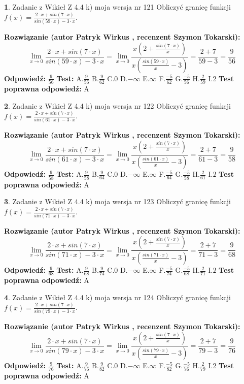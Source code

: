 \documentclass[12pt, a4paper]{article}
\theoremstyle{definition} %
\newtheorem{zad}{}
\newcommand{\zadStart}[1]{\begin{zad}#1\newline}
\newcommand{\zadStop}{\end{zad}}
\newcommand{\rozwStart}[2]{\noindent \textbf{Rozwiązanie (autor #1 , recenzent #2): }\newline}
\newcommand{\rozwStop}{\newline}
\newcommand{\odpStart}{\noindent \textbf{Odpowiedź:}\newline}
\newcommand{\odpStop}{\newline}
\newcommand{\testStart}{\noindent \textbf{Test:}\newline}
\newcommand{\testStop}{\newline}
\newcommand{\kluczStart}{\noindent \textbf{Test poprawna odpowiedź:}\newline}
\newcommand{\kluczStop}{\newline}
\begin{document}
\zadStart{Zadanie z Wikieł Z 4.4 k) moja wersja nr 121}
Obliczyć granicę funkcji $f(x)=\frac{2\cdot x +sin(7\cdot x)}{sin(59\cdot x) -3\cdot x}$.
\zadStop
\rozwStart{Patryk Wirkus}{Szymon Tokarski}
$$\lim\limits_{x\to 0}\frac{2\cdot x +sin(7\cdot x)}{sin(59\cdot x) -3\cdot x}
=\lim\limits_{x\to 0}\frac{x(2+\frac{sin(7\cdot x)}{x})}{x(\frac{sin(59\cdot x)}{x}-3)}
=\frac{2+7}{59-3} = \frac{9}{56}$$
\rozwStop
\odpStart
$\frac{9}{56}$
\odpStop
\testStart
A.$\frac{9}{56}$
B.$\frac{9}{62}$
C.$0$
D.$-\infty$
E.$\infty$
F.$\frac{-5}{62}$
G.$\frac{-5}{56}$
H.$\frac{2}{59}$
I.$2$
\testStop
\kluczStart
A
\kluczStop



\zadStart{Zadanie z Wikieł Z 4.4 k) moja wersja nr 122}
Obliczyć granicę funkcji $f(x)=\frac{2\cdot x +sin(7\cdot x)}{sin(61\cdot x) -3\cdot x}$.
\zadStop
\rozwStart{Patryk Wirkus}{Szymon Tokarski}
$$\lim\limits_{x\to 0}\frac{2\cdot x +sin(7\cdot x)}{sin(61\cdot x) -3\cdot x}
=\lim\limits_{x\to 0}\frac{x(2+\frac{sin(7\cdot x)}{x})}{x(\frac{sin(61\cdot x)}{x}-3)}
=\frac{2+7}{61-3} = \frac{9}{58}$$
\rozwStop
\odpStart
$\frac{9}{58}$
\odpStop
\testStart
A.$\frac{9}{58}$
B.$\frac{9}{64}$
C.$0$
D.$-\infty$
E.$\infty$
F.$\frac{-5}{64}$
G.$\frac{-5}{58}$
H.$\frac{2}{61}$
I.$2$
\testStop
\kluczStart
A
\kluczStop



\zadStart{Zadanie z Wikieł Z 4.4 k) moja wersja nr 123}
Obliczyć granicę funkcji $f(x)=\frac{2\cdot x +sin(7\cdot x)}{sin(71\cdot x) -3\cdot x}$.
\zadStop
\rozwStart{Patryk Wirkus}{Szymon Tokarski}
$$\lim\limits_{x\to 0}\frac{2\cdot x +sin(7\cdot x)}{sin(71\cdot x) -3\cdot x}
=\lim\limits_{x\to 0}\frac{x(2+\frac{sin(7\cdot x)}{x})}{x(\frac{sin(71\cdot x)}{x}-3)}
=\frac{2+7}{71-3} = \frac{9}{68}$$
\rozwStop
\odpStart
$\frac{9}{68}$
\odpStop
\testStart
A.$\frac{9}{68}$
B.$\frac{9}{74}$
C.$0$
D.$-\infty$
E.$\infty$
F.$\frac{-5}{74}$
G.$\frac{-5}{68}$
H.$\frac{2}{71}$
I.$2$
\testStop
\kluczStart
A
\kluczStop



\zadStart{Zadanie z Wikieł Z 4.4 k) moja wersja nr 124}
Obliczyć granicę funkcji $f(x)=\frac{2\cdot x +sin(7\cdot x)}{sin(79\cdot x) -3\cdot x}$.
\zadStop
\rozwStart{Patryk Wirkus}{Szymon Tokarski}
$$\lim\limits_{x\to 0}\frac{2\cdot x +sin(7\cdot x)}{sin(79\cdot x) -3\cdot x}
=\lim\limits_{x\to 0}\frac{x(2+\frac{sin(7\cdot x)}{x})}{x(\frac{sin(79\cdot x)}{x}-3)}
=\frac{2+7}{79-3} = \frac{9}{76}$$
\rozwStop
\odpStart
$\frac{9}{76}$
\odpStop
\testStart
A.$\frac{9}{76}$
B.$\frac{9}{82}$
C.$0$
D.$-\infty$
E.$\infty$
F.$\frac{-5}{82}$
G.$\frac{-5}{76}$
H.$\frac{2}{79}$
I.$2$
\testStop
\kluczStart
A
\kluczStop
\end{document}
